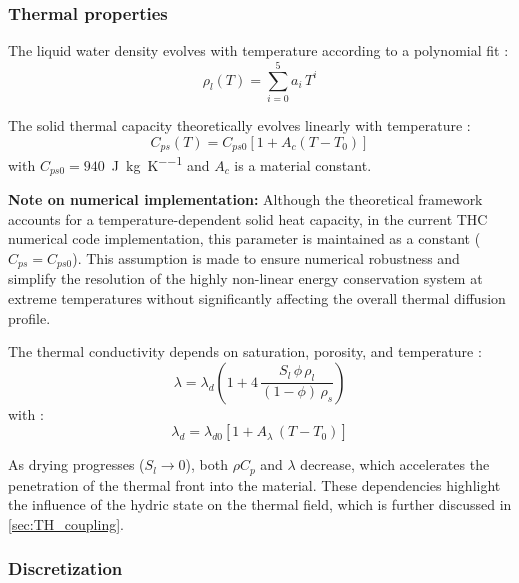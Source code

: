 \subsubsection{Thermal properties} \label{sec:thermal_properties}
The liquid water density evolves with temperature according to a polynomial fit \cite{dauti2018}:
\begin{equation}
    \rho_l(T) = \sum_{i=0}^{5} a_i\,T^i
    \label{eq:rho_l}
\end{equation}

The solid thermal capacity theoretically evolves linearly with temperature \cite{dauti2018}:
\begin{equation}
    C_{ps}(T) = C_{ps0}[1 + A_c(T - T_0)]
    \label{eq:rhoCp}
\end{equation}
with $C_{ps0} = 940$~\si{\joule\per\kilogram\per\kelvin} and $A_c$ is a material constant. 

\textbf{Note on numerical implementation:} Although the theoretical framework accounts for a temperature-dependent solid heat capacity, in the current THC numerical code implementation, this parameter is maintained as a constant ($C_{ps} = C_{ps0}$). This assumption is made to ensure numerical robustness and simplify the resolution of the highly non-linear energy conservation system at extreme temperatures without significantly affecting the overall thermal diffusion profile.

The thermal conductivity depends on saturation, porosity, and temperature \cite{dauti2018}:
\begin{equation}
    \lambda = \lambda_d \left(1 + 4\,\frac{S_l\,\phi\,\rho_l}{(1-\phi)\,\rho_s}\right)
    \label{eq:lambda}
\end{equation}
with \cite{dauti2018}:
\begin{equation}
    \lambda_d = \lambda_{d0}\left[1 + A_\lambda\,(T-T_0)\right]
    \label{eq:lambda_d}
\end{equation}

As drying progresses ($S_l \to 0$), both $\rho C_p$ and $\lambda$ decrease, which accelerates the penetration of the thermal front into the material. These dependencies highlight the influence of the hydric state on the thermal field, which is further discussed in \cref{sec:TH_coupling}.

\subsubsection{Discretization}

